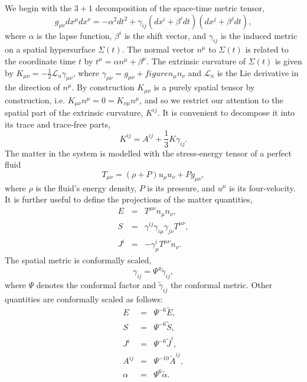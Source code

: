 We begin with the $3+1$ decomposition of the space-time metric
tensor,
\begin{equation}
g_{\mu\nu}dx^{\mu}dx^{\nu} = -\alpha^2dt^2 + \gamma_{ij}\left(dx^i +
  \beta^idt\right)\left(dx^j+\beta^jdt\right),
\end{equation}
where $\alpha$ is the lapse function, $\beta^i$ is the shift vector,
and $\gamma_{ij}$ is the induced metric on a spatial hypersurface
$\Sigma(t)$. The normal vector $n^{\mu}$ to $\Sigma(t)$ is related to
the coordinate time $t$ by $ t^{\mu} = \alpha n^{\mu} + \beta^{\mu}$.
The extrinsic curvature of $\Sigma(t)$ is given by
$ K_{\mu\nu} = -\frac{1}{2}\mathcal{L}_n\gamma_{\mu\nu}$, where
$\gamma_{\mu\nu}=g_{\mu\nu}+figuren_{\mu}n_{\nu}$ and $\mathcal{L}_n$ is the
Lie derivative in the direction of $n^{\mu}$. By construction
$K_{\mu\nu} $ is a purely spatial tensor by construction,
i.e. $K_{\mu\nu}n^\mu=0=K_{\nu\mu}n^\mu$, and so we restrict our
attention to the spatial part of the extrinsic curvature, $K^{ij}$. It
is convenient to decompose it into its trace and trace-free parts,
\begin{equation}
K^{ij} = A^{ij}+\frac{1}{3}K\gamma_{ij}.
\end{equation}
The matter in the system is modelled with the stress-energy tensor of
a perfect fluid 
\begin{equation}
T_{\mu\nu}=\left(\rho+P\right)u_{\mu}u_{\nu}+Pg_{\mu\nu},
\end{equation}
where $\rho$ is the fluid's energy density, $P$ is its pressure, and
$u^{\mu}$ is its four-velocity. It is further useful to define the
projections of the matter quantities,
\begin{eqnarray}
E &=& T^{\mu\nu}n_{\mu}n_{\nu},\\
S &=& \gamma^{ij}\gamma_{i\mu}\gamma_{j\nu}T^{\mu\nu}, \\
J^i &=& -\gamma^{i}_{\mu}T^{\mu\nu}n_{\nu}.
\end{eqnarray}
The spatial metric is conformally scaled,
\begin{equation}
\gamma_{ij}=\Psi^4\tilde{\gamma}_{ij},
\end{equation}
where $\Psi$ denotes the conformal factor and $\tilde{\gamma}_{ij}$
the conformal metric. Other quantities are conformally scaled as follows:
\begin{eqnarray}
E &=& \Psi^{-6}\tilde{E}, \\
S &=& \Psi^{-6}\tilde{S}, \\
J^i &=& \Psi^{-6}\tilde{J}^i, \\
A^{ij} &=& \Psi^{-10}\tilde{A}^{ij}, \\
\alpha &=& \Psi^{6}\tilde{\alpha}. 
\end{eqnarray}
